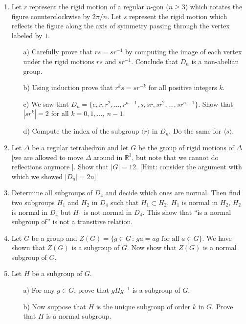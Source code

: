 \documentclass[11pt]{article}
\theoremstyle{definition}  %
\newcommand{\R}{\mathbb{R}}
\begin{document}

\begin{enumerate}

\item Let $r$ represent the rigid motion of a regular $n$-gon ($n \geq 3$) which rotates the figure counterclockwise by $2\pi/n$. Let $s$ represent the rigid motion which reflects
  the figure along the axis of symmetry passing through the vertex labeled by $1$. 
  \begin{itemize}
  \item[a)] Carefully prove that $rs = sr^{-1}$ by computing the image of each vertex under the rigid motions
    $rs$ and $sr^{-1}$. Conclude that $D_{n}$ is a non-abelian group.
  \item[b)] Using induction prove that $r^ks = sr^{-k}$ for all positive integers $k$.
   \item[c)] We saw that $D_{n} = \{ e, r, r^2, \ldots, r^{n-1}, s, sr, sr^2, \ldots, sr^{n-1} \}$. Show that $|sr^k| = 2$ for all $k=0,1, \ldots,~{n-1}$.  
   \item[d)] Compute the index of the subgroup $\langle r \rangle$ in $D_{n}$. Do the same for $\langle s \rangle$. 
  \end{itemize}
\item Let $\Delta$ be a regular tetrahedron and let $G$ be the group of rigid motions of $\Delta$ [we are allowed to move $\Delta$ around in $\R^3$, but note
  that we cannot do reflections anymore ]. Show that $|G| = 12$. [Hint: consider the argument with which we showed $|D_{n}| = 2n$]
\item Determine all subgroups of $D_4$ and decide which ones are normal. Then find two subgroups $H_1$ and $H_2$ in $D_4$ such that $H_1 \subset H_2$,
  $H_1$ is normal in $H_2$, $H_2$ is normal in $D_4$ but $H_1$ is not normal in $D_4$. This show that ``is a normal subgroup of'' is not a transitive relation. 
\item Let $G$ be a group and $Z(G) = \{ g \in G \, : \, ga = ag \mbox{ for all } a \in G\}$. We have shown that $Z(G)$ is a subgroup of $G$. Now show that $Z(G)$
  is a normal subgroup of $G$. 
\item Let $H$ be a subgroup of $G$.
  \begin{itemize}
     \item[a)] For any $g \in G$, prove that $gHg^{-1}$ is a subgroup of $G$.
     \item[b)] Now suppose that $H$ is the unique subgroup of order $k$ in $G$. Prove that $H$ is a normal subgroup. 
   \end{itemize}
\end{enumerate}
\end{document}
